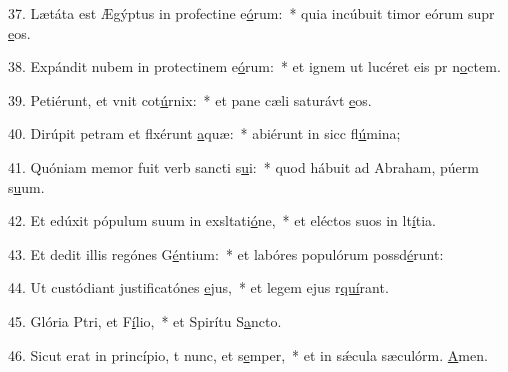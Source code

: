 37. Lætáta est Ægýptus in profectine e\uline{ó}rum:~* quia incúbuit timor eórum supr \uline{e}os.\par 
38. Expándit nubem in protectinem e\uline{ó}rum:~* et ignem ut lucéret eis pr n\uline{o}ctem.\par 
39. Petiérunt, et vnit cot\uline{ú}rnix:~* et pane cæli saturávt \uline{e}os.\par 
40. Dirúpit petram et flxérunt \uline{a}quæ:~* abiérunt in sicc fl\uline{ú}mina;\par 
41. Quóniam memor fuit verb sancti s\uline{u}i:~* quod hábuit ad Abraham, púerm s\uline{u}um.\par 
42. Et edúxit pópulum suum in exsltati\uline{ó}ne,~* et eléctos suos in lt\uline{í}tia.\par 
43. Et dedit illis regónes G\uline{é}ntium:~* et labóres populórum possd\uline{é}runt:\par 
44. Ut custódiant justificatónes \uline{e}jus,~* et legem ejus r\uline{quí}rant.\par 
45. Glória Ptri, et F\uline{í}lio,~* et Spirítu S\uline{a}ncto.\par 
46. Sicut erat in princípio, t nunc, et s\uline{e}mper,~* et in sǽcula sæculórm. \uline{A}men.\par 
